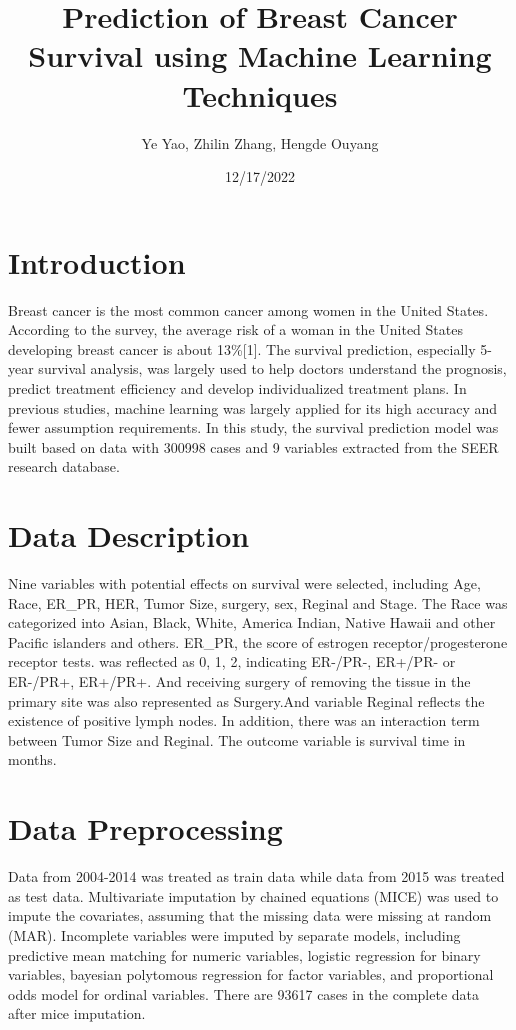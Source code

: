 \documentclass[
  12pt,
]{article}
\title{Prediction of Breast Cancer Survival using Machine Learning
Techniques}
\author{Ye Yao, Zhilin Zhang, Hengde Ouyang}
\date{12/17/2022}
\begin{document}
\maketitle

\hypertarget{introduction}{%
\section{Introduction}\label{introduction}}

Breast cancer is the most common cancer among women in the United
States. According to the survey, the average risk of a woman in the
United States developing breast cancer is about 13\%{[}1{]}. The
survival prediction, especially 5-year survival analysis, was largely
used to help doctors understand the prognosis, predict treatment
efficiency and develop individualized treatment plans. In previous
studies, machine learning was largely applied for its high accuracy and
fewer assumption requirements. In this study, the survival prediction
model was built based on data with 300998 cases and 9 variables
extracted from the SEER research database.

\hypertarget{data-description}{%
\section{Data Description}\label{data-description}}

Nine variables with potential effects on survival were selected,
including Age, Race, ER\_PR, HER, Tumor Size, surgery, sex, Reginal and
Stage. The Race was categorized into Asian, Black, White, America
Indian, Native Hawaii and other Pacific islanders and others. ER\_PR,
the score of estrogen receptor/progesterone receptor tests. was
reflected as 0, 1, 2, indicating ER-/PR-, ER+/PR- or ER-/PR+, ER+/PR+.
And receiving surgery of removing the tissue in the primary site was
also represented as Surgery.And variable Reginal reflects the existence
of positive lymph nodes. In addition, there was an interaction term
between Tumor Size and Reginal. The outcome variable is survival time in
months.

\hypertarget{data-preprocessing}{%
\section{Data Preprocessing}\label{data-preprocessing}}

Data from 2004-2014 was treated as train data while data from 2015 was
treated as test data. Multivariate imputation by chained equations
(MICE) was used to impute the covariates, assuming that the missing data
were missing at random (MAR). Incomplete variables were imputed by
separate models, including predictive mean matching for numeric
variables, logistic regression for binary variables, bayesian polytomous
regression for factor variables, and proportional odds model for ordinal
variables. There are 93617 cases in the complete data after mice
imputation.
\end{document}
